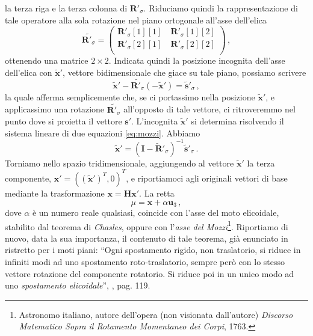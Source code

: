 la terza riga e la terza colonna di ${\bm R}'_{\sigma}$.
Riduciamo quindi la rappresentazione di tale operatore
alla sola rotazione nel piano ortogonale
all'asse dell'elica
\begin{equation}
\tilde{{\bm R}'_{\sigma}}=\left( \begin{array}{cc}
{\bm R}'_{\sigma}[1][1] & \
{\bm R}'_{\sigma}[1][2]\\
{\bm R}'_{\sigma}[2][1] & \
{\bm R}'_{\sigma}[2][2]\\
\end{array}
\right)
\,,
\label{eq:op_rot_2d}
\end{equation}
\noindent ottenendo una matrice $2\times2$.
Indicata quindi 
la posizione incognita dell'asse dell'elica con $\tilde{\bm x}'$, vettore 
bidimensionale che giace su tale piano,
possiamo scrivere
\begin{equation}
\tilde{\bm x}' - \tilde{{\bm R}'_{\sigma}}(-\tilde{\bm x}')={\tilde{{\bm s}}'}_{\sigma}\,,
\label{eq:mozzi}
\end{equation}
\noindent la quale afferma semplicemente che, se ci portassimo nella posizione
$\tilde{\bm x}'$, e applicassimo una rotazione $\tilde{{\bm R}'_{\sigma}}$ all'opposto
di tale vettore, ci ritroveremmo nel punto dove si proietta il vettore
${\bm s}'$. L'incognita $\tilde{{\bm x}}'$ si determina
risolvendo il sistema lineare di due equazioni \ref{eq:mozzi}. Abbiamo
\begin{equation}
\tilde{{\bm x}}'=({{\bm I} -\tilde{\bm R}'_{\sigma}})^{-1}{\tilde{{\bm s}}'}_{\sigma}\,.
\label{eq:sol_mozzi}
\end{equation}
\noindent Torniamo nello spazio tridimensionale, aggiungendo al 
vettore $\tilde{\bm x}'$ la terza componente,
${\bm x}'=((\tilde{\bm x}')^T,0)^T$, e riportiamoci agli originali vettori
di base mediante la trasformazione ${\bm x}={\bm H}{\bm x}'$.
La retta
\begin{equation}
\mu={\bm x} + \alpha {\bm u}_3\,,
\label{eq:asse_m}
\end{equation}
\noindent dove $\alpha$ \`e un numero reale qualsiasi,
coincide con l'asse del moto elicoidale, stabilito dal teorema
di {\em Chasles},
oppure con l'{\em asse del Mozzi}\index{asse del {\em Mozzi}}\footnote
{
Astronomo italiano, autore dell'opera (non visionata dall'autore) {\em
Discorso Matematico Sopra il Rotamento Momentaneo dei Corpi}, 1763.
}.
Riportiamo di nuovo, data la sua importanza,
il contenuto di tale teorema,
 gi\`a enunciato in ristretto
per i moti piani: ``Ogni spostamento rigido, non traslatorio, si riduce in
infiniti modi ad uno spostamento roto-traslatorio, sempre per\`o con lo stesso
vettore rotazione del componente rotatorio. Si riduce poi in un unico modo 
ad uno {\em spostamento elicoidale}\index{spostamento elicoidale}'', \cite{finzi}, pag. 119.

